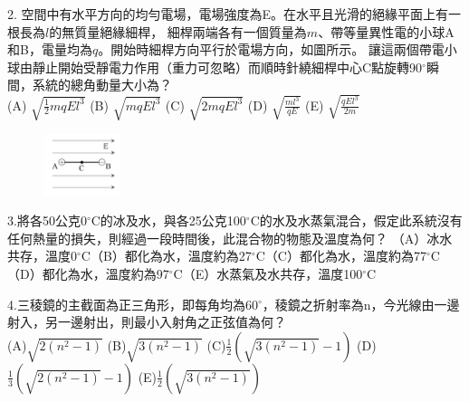 \documentclass[cn,10pt,math=newtx,chinesefont=founder,device=ig]{elegantbook}
\begin{document}
\begin{example}
  2.	空間中有水平方向的均勻電場，電場強度為E。在水平且光滑的絕緣平面上有一根長為$l$的無質量絕緣細桿，
  細桿兩端各有一個質量為$m$、帶等量異性電的小球A和B，電量均為$q$。開始時細桿方向平行於電場方向，如圖所示。
  讓這兩個帶電小球由靜止開始受靜電力作用（重力可忽略）而順時針繞細桿中心C點旋轉90$^\circ$瞬間，系統的總角動量大小為？\\
  (A) $\sqrt{\frac{1}{2} mqE l^3}$ (B) $\sqrt{mq E l^3}$ (C) $\sqrt{2mqE l^3}$ (D) $\sqrt{\frac{m l^3}{qE}}$ (E) $\sqrt{\frac{qE l^3}{2m}}$ \\
  \rightline{[成德高中教甄109]}
\end{example}
\begin{solution}
  
\end{solution}
\begin{figure}[htbp]
    \flushright
    \includegraphics[width=0.2\textwidth]{image/109成德2.png}
\end{figure}

\newpage



\begin{example}
   3.將各50公克0$^\circ$C的冰及水，與各25公克100$^\circ$C的水及水蒸氣混合，假定此系統沒有任何熱量的損失，則經過一段時間後，此混合物的物態及溫度為何？
   （A）冰水共存，溫度0$^\circ$C（B）都化為水，溫度約為27$^\circ$C（C）都化為水，溫度約為77$^\circ$C（D）都化為水，溫度約為97$^\circ$C（E）水蒸氣及水共存，溫度100$^\circ$C
   \\
    \rightline{[成德高中教甄109]}
\end{example}
\begin{solution}
    
\end{solution}

\newpage


\begin{example}
   4.三稜鏡的主截面為正三角形，即每角均為60$^\circ$，稜鏡之折射率為n，今光線由一邊射入，另一邊射出，則最小入射角之正弦值為何？\\
   (A)$\sqrt{2 (n^2 - 1)}$ (B)$\sqrt{3 (n^2 - 1)}$ (C)$\frac{1}{2} (\sqrt{3 (n^2 - 1)}-1)$ (D)$\frac{1}{3} (\sqrt{2 (n^2 - 1)}-1)$ (E)$\frac{1}{2} (\sqrt{3 (n^2 - 1)})$
   \\
    \rightline{[成德高中教甄109]}
\end{example}
\begin{solution}
    
\end{solution}
\end{document}
